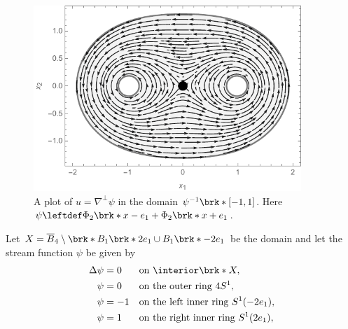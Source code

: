\begin{frame}
  \begin{figure}
    \centering
    \includegraphics[width=0.9\textwidth]{../Plots/n2_hvf_noInflowNoOutflow_symmetric_gray_2.pdf}
    \caption{A plot of $u=\nabla^\perp\psi$ in the domain $\psi^{-1}\brk*{[-1,1]}$.
      Here $\psi\leftdef\Phi_2\brk*{x-e_1}+\Phi_2\brk*{x+e_1}$.}
    \label{pl:n2_hvf_noInflowNoOutflow}
  \end{figure}
\end{frame}

\begin{frame}
  \begin{example}
    Let $X=\overline{B}_4\setminus\brk*{B_1\brk*{2e_1}\cup B_1\brk*{-2e_1}}$ be the domain and let the stream function $\psi$ be given by
    \begin{equation*}
      \begin{aligned}
        \Delta \psi&=0 &&\text{on }\openX, \\
        \psi&=0 &&\text{on the outer ring }4S^1, \\
        \psi&=-1 &&\text{on the left inner ring }S^1(-2e_1), \\
        \psi&=1 &&\text{on the right inner ring }S^1(2e_1),
      \end{aligned}\label{eq:n2:hvf:roundRegion:InflowOutflow}
    \end{equation*} 
  \end{example}
  
\end{frame}

